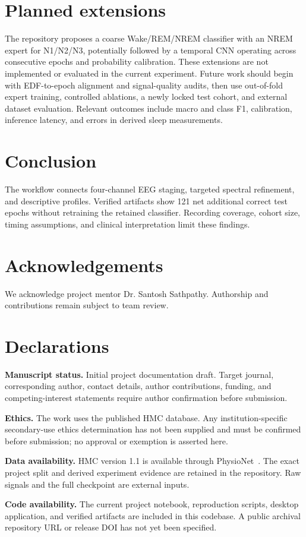 \documentclass[pdflatex,sn-mathphys-num]{sn-jnl}
\begin{document}
\section{Planned extensions}\label{sec:future}
The repository proposes a coarse Wake/REM/NREM classifier with an NREM expert for N1/N2/N3, potentially followed by a temporal CNN operating across consecutive epochs and probability calibration. These extensions are not implemented or evaluated in the current experiment. Future work should begin with EDF-to-epoch alignment and signal-quality audits, then use out-of-fold expert training, controlled ablations, a newly locked test cohort, and external dataset evaluation. Relevant outcomes include macro and class F1, calibration, inference latency, and errors in derived sleep measurements.

\section{Conclusion}
The workflow connects four-channel EEG staging, targeted spectral refinement, and descriptive profiles. Verified artifacts show 121 net additional correct test epochs without retraining the retained classifier. Recording coverage, cohort size, timing assumptions, and clinical interpretation limit these findings.

\section*{Acknowledgements}
We acknowledge project mentor Dr. Santosh Sathpathy. Authorship and contributions remain subject to team review.

\section*{Declarations}
\textbf{Manuscript status.} Initial project documentation draft. Target journal, corresponding author, contact details, author contributions, funding, and competing-interest statements require author confirmation before submission.

\textbf{Ethics.} The work uses the published HMC database. Any institution-specific secondary-use ethics determination has not been supplied and must be confirmed before submission; no approval or exemption is asserted here.

\textbf{Data availability.} HMC version 1.1 is available through PhysioNet~\cite{hmc2022}. The exact project split and derived experiment evidence are retained in the repository. Raw signals and the full checkpoint are external inputs.

\textbf{Code availability.} The current project notebook, reproduction scripts, desktop application, and verified artifacts are included in this codebase. A public archival repository URL or release DOI has not yet been specified.

\clearpage

\end{document}
